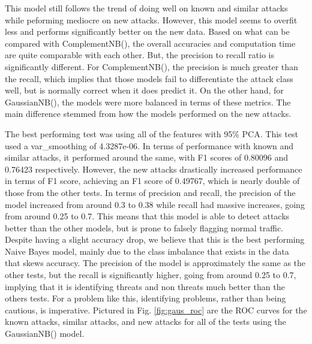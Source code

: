 

This model still follows the trend of doing well on known and similar attacks while peforming mediocre on new attacks. However, this model seems to overfit less and performs significantly better on the new data. Based on what can be compared with ComplementNB(), the overall accuracies and computation time are quite comparable with each other. But, the precision to recall ratio is significantly different. For ComplementNB(), the precision is much greater than the recall, which implies that those models fail to differentiate the attack class well, but is normally correct when it does predict it. On the other hand, for GaussianNB(), the models were more balanced in terms of these metrics. The main difference stemmed from how the models performed on the new attacks.

The best performing test was using all of the features with 95\% PCA. This test used a var\_smoothing of 4.3287e-06. In terms of performance with known and similar attacks, it performed around the same, with F1 scores of 0.80096 and 0.76423 respectively. However, the new attacks drastically increased performance in terms of F1 score, achieving an F1 score of 0.49767, which is nearly double of those from the other tests. In terms of precision and recall, the precision of the model increased from around 0.3 to 0.38 while recall had massive increases, going from around 0.25 to 0.7. This means that this model is able to detect attacks better than the other models, but is prone to falsely flagging normal traffic. Despite having a slight accuracy drop, we believe that this is the best performing Naive Bayes model, mainly due to the class imbalance that exists in the data that skews accuracy. The precision of the model is approximately the same as the other tests, but the recall is significantly higher, going from around 0.25 to 0.7, implying that it is identifying threats and non threats much better than the others tests. For a problem like this, identifying problems, rather than being cautious, is imperative. Pictured in Fig. \ref{fig:gaus_roc} are the ROC curves for the known attacks, similar attacks, and new attacks for all of the tests using the GaussianNB() model. 


